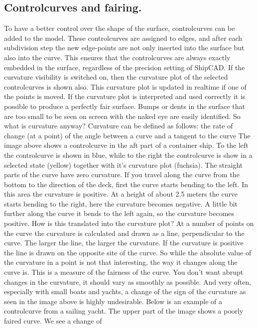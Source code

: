 \documentclass[12pt]{article}
\begin{document}
\subsection{Controlcurves and fairing.}
To have a better control over the shape of the surface, controlcurves can be added to the model.
These controlcurves are assigned to edges, and after each subdivision step the new edge-points
are not only inserted into the surface but also into the curve. This ensures that the controlcurves are
always exactly embedded in the surface, regardless of the precision setting of ShipCAD. If the
curvature visibility is switched on, then the curvature plot of the selected controlcurves is shown
also. This curvature plot is updated in realtime if one of the points is moved. If the curvature plot is
interpreted and used correctly it is possible to produce a perfectly fair surface. Bumps or dents in
the surface that are too small to be seen on screen with the naked eye are easily identified.
So what is curvature anyway? Curvature can be defined as follows:
the rate of change (at a point) of the angle between a curve
and a tangent to the curve
The image above shows a controlcurve in the aft part of a container ship. To the left the
controlcurve is shown in blue, while to the right the controlcurve is show in a selected state (yellow)
together with it's curvature plot (fuchsia). The straight parts of the curve have zero curvature. If you
travel along the curve from the bottom to the direction of the deck, first the curve starts bending to
the left. In this area the curvature is positive. At a height of about 2.5 meters the curve starts
bending to the right, here the curvature becomes negative. A little bit further along the curve it
bends to the left again, so the curvature becomes positive. How is this translated into the curvature
plot? At a number of points on the curve the curvature is calculated and drawn as a line,
perpendicular to the curve. The larger the line, the larger the curvature. If the curvature is positive
the line is drawn on the opposite site of the curve. So while the absolute value of the curvature in a
point is not that interesting, the way it changes along the curve is. This is a measure of the fairness
of the curve. You don't want abrupt changes in the curvature, it should vary as smoothly as
possible. And very often, especially with small boats and yachts, a change of the sign of the
curvature as seen in the image above is highly undesirable. Below is an example of a controlcurve
from a sailing yacht. The upper part of the image shows a poorly faired curve. We see a change of
\end{document}
